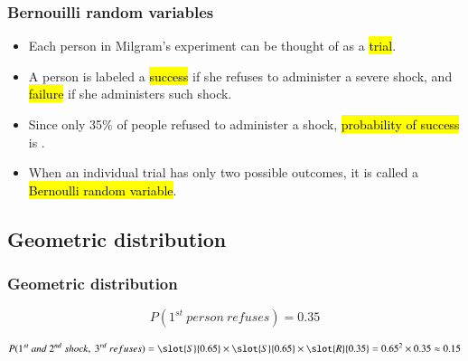 
\begin{frame}
\frametitle{Bernouilli random variables}

\begin{itemize}

\item Each person in Milgram's experiment can be thought of as a \hl{trial}.

\item A person is labeled a \hl{success} if she refuses to administer a severe shock, and \hl{failure} if she administers such shock.

\item Since only 35\% of people refused to administer a shock, \hl{probability of success} is .

\item When an individual trial has only two possible outcomes, it is called a \hl{Bernoulli random variable}.

\end{itemize}

\end{frame}


\subsection{Geometric distribution}

\begin{frame}
\frametitle{Geometric distribution}

{\small


\[ P(1^{st}~person~refuses) = 0.35 \]

\pause

\[ P(1^{st}~and~2^{nd}~shock,~3^{rd}~refuses) = \slot{S}{0.65} \times \slot{S}{0.65} \times  \slot{R}{0.35} = 0.65^2 \times 0.35 \approx 0.15 \]

\pause

\soln{
\pause
\[ P(9~shock,~10^{th}~refuses) = \underbrace{\slot{S}{0.65} \times \cdots \times \slot{S}{0.65}}_{9~of~these} \times  \slot{R}{0.35} = 0.65^9 \times 0.35 \approx 0.0072 \]
}
}

\end{frame}


